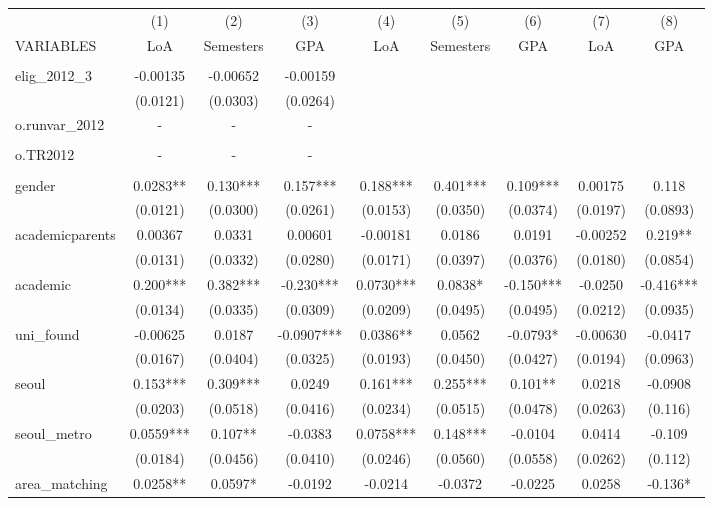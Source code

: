 \documentclass[]{article}
\begin{document}
\begin{tabular}{lcccccccc} \hline
 & (1) & (2) & (3) & (4) & (5) & (6) & (7) & (8) \\
VARIABLES & LoA & Semesters & GPA & LoA & Semesters & GPA & LoA & GPA \\ \hline
 &  &  &  &  &  &  &  &  \\
elig\_2012\_3 & -0.00135 & -0.00652 & -0.00159 &  &  &  &  &  \\
 & (0.0121) & (0.0303) & (0.0264) &  &  &  &  &  \\
o.runvar\_2012 & - & - & - &  &  &  &  &  \\
 &  &  &  &  &  &  &  &  \\
o.TR2012 & - & - & - &  &  &  &  &  \\
 &  &  &  &  &  &  &  &  \\
gender & 0.0283** & 0.130*** & 0.157*** & 0.188*** & 0.401*** & 0.109*** & 0.00175 & 0.118 \\
 & (0.0121) & (0.0300) & (0.0261) & (0.0153) & (0.0350) & (0.0374) & (0.0197) & (0.0893) \\
academicparents & 0.00367 & 0.0331 & 0.00601 & -0.00181 & 0.0186 & 0.0191 & -0.00252 & 0.219** \\
 & (0.0131) & (0.0332) & (0.0280) & (0.0171) & (0.0397) & (0.0376) & (0.0180) & (0.0854) \\
academic & 0.200*** & 0.382*** & -0.230*** & 0.0730*** & 0.0838* & -0.150*** & -0.0250 & -0.416*** \\
 & (0.0134) & (0.0335) & (0.0309) & (0.0209) & (0.0495) & (0.0495) & (0.0212) & (0.0935) \\
uni\_found & -0.00625 & 0.0187 & -0.0907*** & 0.0386** & 0.0562 & -0.0793* & -0.00630 & -0.0417 \\
 & (0.0167) & (0.0404) & (0.0325) & (0.0193) & (0.0450) & (0.0427) & (0.0194) & (0.0963) \\
seoul & 0.153*** & 0.309*** & 0.0249 & 0.161*** & 0.255*** & 0.101** & 0.0218 & -0.0908 \\
 & (0.0203) & (0.0518) & (0.0416) & (0.0234) & (0.0515) & (0.0478) & (0.0263) & (0.116) \\
seoul\_metro & 0.0559*** & 0.107** & -0.0383 & 0.0758*** & 0.148*** & -0.0104 & 0.0414 & -0.109 \\
 & (0.0184) & (0.0456) & (0.0410) & (0.0246) & (0.0560) & (0.0558) & (0.0262) & (0.112) \\
area\_matching & 0.0258** & 0.0597* & -0.0192 & -0.0214 & -0.0372 & -0.0225 & 0.0258 & -0.136* \\

\end{tabular}
\end{document}
